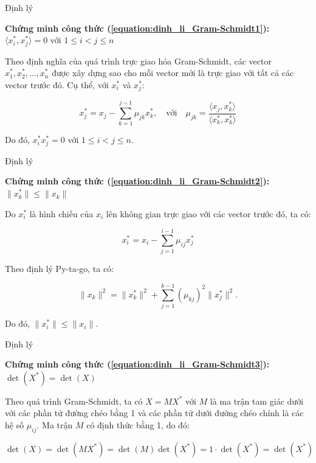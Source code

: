 \documentclass{beamer}
\numberwithin{equation}{section}
\begin{document}
\begin{frame}{Định lý}

\textbf{Chứng minh công thức (\ref{equation:dinh_li_Gram-Schmidt1}):}
$\langle x_i^*, x_j^* \rangle = 0$ với $1 \leq i < j \leq n$

Theo định nghĩa của quá trình trực giao hóa Gram-Schmidt,
các vector $x_1^*, x_2^*, \ldots, x_n^*$ được xây dựng sao cho
mỗi vector mới là trực giao với tất cả các vector trước đó.
Cụ thể, với $x_i^*$ và $x_j^*$:

\[
x_j^* = x_j - \sum_{k=1}^{j-1} \mu_{jk} x_k^*, \quad \text{với} \quad \mu_{jk} = \frac{\langle x_j, x_k^* \rangle}{\langle x_k^*, x_k^* \rangle}
\]

Do đó, $ x_i^* x_j^* = 0$ với $1 \leq i < j \leq n$.

\end{frame}
\begin{frame}{Định lý}

\textbf{Chứng minh công thức (\ref{equation:dinh_li_Gram-Schmidt2}):}
$\|x_k^*\| \leq \|x_k\|$

Do $x_i^*$ là hình chiếu của $x_i$ lên không gian trực giao với các vector trước đó, ta có:

\[
x_i^* = x_i - \sum_{j=1}^{i-1} \mu_{ij} x_j^*
\]

Theo định lý Py-ta-go, ta có:

\[
\|x_k\|^2 = \|x_k^*\|^2 + \sum_{j=1}^{k-1} (\mu_{kj})^2 \|x_j^*\|^2.
\]

Do đó, $\|x_i^*\| \leq \|x_i\|$.

\end{frame}
\begin{frame}{Định lý}

\textbf{Chứng minh công thức (\ref{equation:dinh_li_Gram-Schmidt3}):}
$\det(X^*) = \det(X)$
 

Theo quá trình Gram-Schmidt, ta có $X = MX^*$
với $M$ là ma trận tam giác dưới với các phần tử đường chéo bằng 1 và các phần tử dưới đường chéo chính là các hệ số $\mu_{ij}$.
Ma trận $M$ có định thức bằng 1, do đó:

\[
\det(X) = \det(MX^*) = \det(M) \det(X^*) = 1 \cdot \det(X^*) = \det(X^*)
\]

\end{frame}
\end{document}
